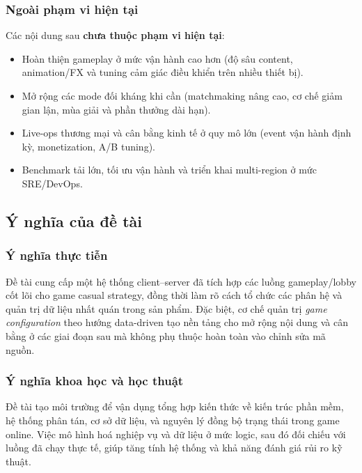 \subsubsection{Ngoài phạm vi hiện tại}

Các nội dung sau \textbf{chưa thuộc phạm vi hiện tại}:

\begin{itemize}
    \item Hoàn thiện gameplay ở mức vận hành cao hơn (độ sâu content, animation/\allowbreak FX và tuning cảm giác điều khiển trên nhiều thiết bị).
    \item Mở rộng các mode đối kháng khi cần (matchmaking nâng cao, cơ chế giảm gian lận, mùa giải và phần thưởng dài hạn).
    \item Live-ops thương mại và cân bằng kinh tế ở quy mô lớn (event vận hành định kỳ, monetization, A/\allowbreak B tuning).
    \item Benchmark tải lớn, tối ưu vận hành và triển khai multi-region ở mức SRE/\allowbreak DevOps.
\end{itemize}

\subsection{Ý nghĩa của đề tài}

\subsubsection{Ý nghĩa thực tiễn}

Đề tài cung cấp một hệ thống client--server đã tích hợp các luồng gameplay/\allowbreak lobby cốt lõi cho game casual strategy, đồng thời làm rõ cách tổ chức các phân hệ và quản trị dữ liệu nhất quán trong sản phẩm. Đặc biệt, cơ chế quản trị \textit{game configuration} theo hướng data-driven tạo nền tảng cho mở rộng nội dung và cân bằng ở các giai đoạn sau mà không phụ thuộc hoàn toàn vào chỉnh sửa mã nguồn\cite{adams-game-design,gregory-engine}.

\subsubsection{Ý nghĩa khoa học và học thuật}

Đề tài tạo môi trường để vận dụng tổng hợp kiến thức về kiến trúc phần mềm, hệ thống phân tán, cơ sở dữ liệu, và nguyên lý đồng bộ trạng thái trong game online. Việc mô hình hoá nghiệp vụ và dữ liệu ở mức logic, sau đó đối chiếu với luồng đã chạy thực tế, giúp tăng tính hệ thống và khả năng đánh giá rủi ro kỹ thuật\cite{moriarty-networked,gregory-engine}.

